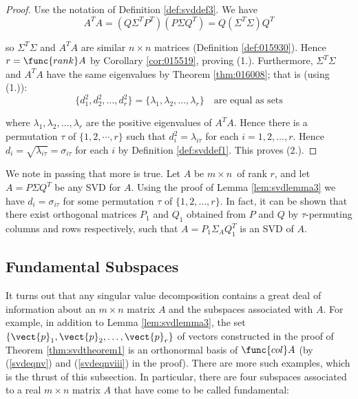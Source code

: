 \begin{proof} Use the notation of Definition \ref{def:svddef3}. We
have
\begin{equation*}
A^{T}A=(Q\Sigma^{T}P^{T})(P\Sigma Q^{T})=Q(\Sigma^{T}\Sigma)Q^{T}
\end{equation*}

\noindent so $\Sigma^{T}\Sigma $ and $A^{T}A$ are similar $n\times n$
matrices (Definition \ref{def:015930}). Hence $r=\func{rank} A$ by
Corollary \ref{cor:015519}, proving (1.).  Furthermore, $\Sigma^{T}\Sigma $ and $A^{T}A$
have the same eigenvalues by Theorem \ref{thm:016008}; that is (using (1.)):
\begin{equation*}
\{d_{1}^{2},d_{2}^{2},\dots ,d_{r}^{2}\}=\{\lambda_{1},\lambda_{2},\dots ,\lambda_{r}\} \quad \mbox{are equal as sets} 
\end{equation*} 

\noindent where $\lambda_{1},\lambda_{2},\dots ,\lambda_{r}$ are the
positive eigenvalues of $A^{T}A$. Hence there is a permutation $\tau $ of $\{1,2,\cdots ,r\}$ such that  $d_{i}^{2}=\lambda_{i\tau }$ for each $i=1,2,\dots ,r$. Hence $d_{i}=\sqrt{\lambda_{i\tau }}=\sigma_{i\tau }$
for each $i$ by Definition \ref{def:svddef1}. This proves (2.). 
\end{proof} 

We note in passing that more is true. Let $A$ be $m\times n$\ of rank $r$,
and let $A=P\Sigma Q^{T}$ be any SVD for $A$. Using the proof of Lemma \ref{lem:svdlemma3}
we have $d_{i}=\sigma_{i\tau }$ for some permutation $\tau $ of $\{1,2,\dots ,r\}.$ In fact, it can be shown that there exist orthogonal
matrices $P_{1}$ and $Q_{1}$ obtained from $P$ and $Q$ by $\tau$-permuting columns and rows respectively, such that $A=P_{1}\Sigma_{A}Q_{1}^{T}$ is an SVD of $A$. 


\subsection{Fundamental Subspaces}

\noindent It turns out that any singular value decomposition contains a
great deal of information about an $m\times n$ matrix $A$ and the subspaces
associated with $A$. For example, in addition to Lemma \ref{lem:svdlemma3}, the set $\{\vect{p}_{1},\vect{p}_{2},\ldots ,\vect{p}_{r}\}$ of vectors
constructed in the proof of Theorem \ref{thm:svdtheorem1} is an orthonormal basis of $\func{col} A$ (by (\ref{svdeqnv}) and (\ref{svdeqnviii}) in the proof). There
are more such examples, which is the thrust of this subsection. In
particular, there are four subspaces associated to a real $m\times n$ matrix 
$A$ that have come to be called fundamental: 

